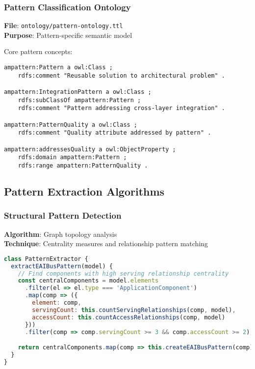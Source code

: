 \documentclass[12pt,a4paper]{article}
\begin{document}
\subsubsection{Pattern Classification Ontology}
\textbf{File}: \texttt{ontology/pattern-ontology.ttl}\\
\textbf{Purpose}: Pattern-specific semantic model

Core pattern concepts:

\begin{lstlisting}[style=turtle,caption=Pattern Classification]
ampattern:Pattern a owl:Class ;
    rdfs:comment "Reusable solution to architectural problem" .

ampattern:IntegrationPattern a owl:Class ;
    rdfs:subClassOf ampattern:Pattern ;
    rdfs:comment "Pattern addressing cross-layer integration" .

ampattern:PatternQuality a owl:Class ;
    rdfs:comment "Quality attribute addressed by pattern" .

ampattern:addressesQuality a owl:ObjectProperty ;
    rdfs:domain ampattern:Pattern ;
    rdfs:range ampattern:PatternQuality .
\end{lstlisting}

\subsection{Pattern Extraction Algorithms}

\subsubsection{Structural Pattern Detection}
\textbf{Algorithm}: Graph topology analysis\\
\textbf{Technique}: Centrality measures and relationship pattern matching

\begin{lstlisting}[language=JavaScript,caption=Integration Pattern Detection]
class PatternExtractor {
  extractEAIBusPattern(model) {
    // Find components with high serving relationship centrality
    const centralComponents = model.elements
      .filter(el => el.type === 'ApplicationComponent')
      .map(comp => ({
        element: comp,
        servingCount: this.countServingRelationships(comp, model),
        accessCount: this.countAccessRelationships(comp, model)
      }))
      .filter(comp => comp.servingCount >= 3 && comp.accessCount >= 2);

    return centralComponents.map(comp => this.createEAIBusPattern(comp));
  }
}
\end{lstlisting}
\end{document}
